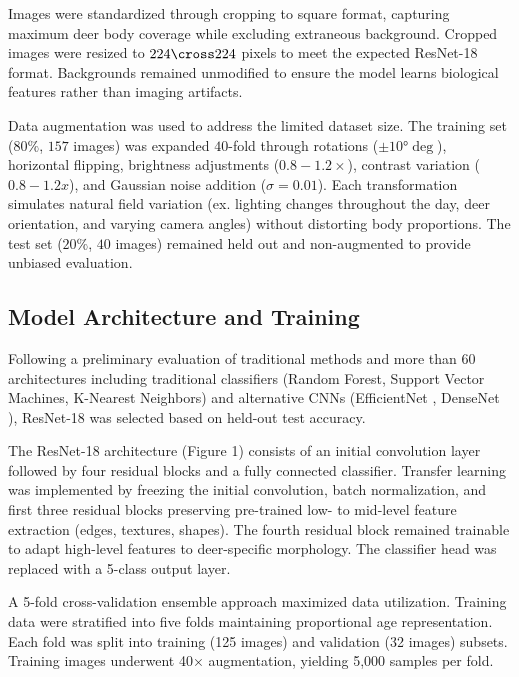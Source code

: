 \documentclass{iopjournal}
\begin{document}
Images were standardized through cropping to square format, capturing maximum deer body coverage while excluding extraneous background. Cropped images were resized to $224\cross224$ pixels to meet the expected ResNet-18 format. Backgrounds remained unmodified to ensure the model learns biological features rather than imaging artifacts.

Data augmentation was used to address the limited dataset size. The training set ($80\%$, $157$ images) was expanded $40$-fold through rotations ($\pm10°\deg$), horizontal flipping, brightness adjustments ($0.8-1.2×$), contrast variation ($0.8-1.2x$), and Gaussian noise addition ($\sigma=0.01$). Each transformation simulates natural field variation (ex. lighting changes throughout the day, deer orientation, and varying camera angles) without distorting body proportions. The test set ($20\%$, $40$ images) remained held out and non-augmented to provide unbiased evaluation.

\subsection{Model Architecture and Training}

Following a preliminary evaluation of traditional methods and more than 60 architectures including traditional classifiers (Random Forest, Support Vector Machines, K-Nearest Neighbors) and alternative CNNs (EfficientNet \cite{tan2019efficientnet}, DenseNet \cite{huang2017densely}), ResNet-18 \cite{he2015deep} was selected based on held-out test accuracy.

The ResNet-18 architecture (Figure 1) consists of an initial convolution layer followed by four residual blocks and a fully connected classifier. Transfer learning was implemented by freezing the initial convolution, batch normalization, and first three residual blocks preserving pre-trained low- to mid-level feature extraction (edges, textures, shapes). The fourth residual block remained trainable to adapt high-level features to deer-specific morphology. The classifier head was replaced with a 5-class output layer.

A 5-fold cross-validation ensemble approach maximized data utilization. Training data were stratified into five folds maintaining proportional age representation. Each fold was split into training (125 images) and validation (32 images) subsets. Training images underwent 40× augmentation, yielding 5,000 samples per fold.
\end{document}
